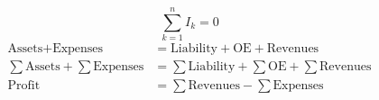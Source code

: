 \begin{equation}
\sum_{k=1}^n I_k = 0
\end{equation}
\begin{align}
    \text{Assets} + \text{Expenses} &= \text{Liability} + \text{OE} + \text{Revenues} \\
    \sum \text{Assets} + \sum \text{Expenses} &= \sum \text{Liability} + \sum \text{OE} + \sum \text{Revenues} \\
    \text{Profit} &= \sum \text{Revenues} - \sum \text{Expenses}
\end{align}

